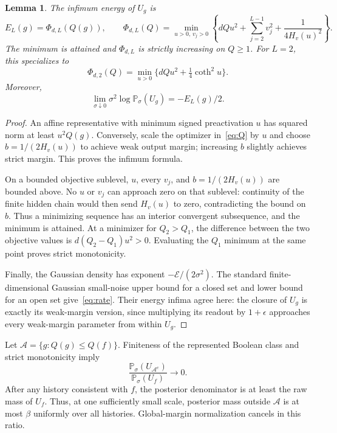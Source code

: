 \documentclass[11pt]{article}
\newtheorem{lemma}[theorem]{Lemma}
\newcommand{\Pp}{\mathbb P}
\begin{document}
\begin{lemma}\label{lem:energy}
The infimum energy of $U_g$ is
\begin{equation}\label{eq:phi}
 E_L(g)=\Phi_{d,L}(Q(g)),\qquad
 \Phi_{d,L}(Q)=\min_{u>0,\,v_j>0}
 \left\{dQu^2+\sum_{j=2}^{L-1}v_j^2+
              \frac{1}{4H_v(u)^2}\right\}.
\end{equation}
The minimum is attained and $\Phi_{d,L}$ is strictly increasing on $Q\ge1$. For $L=2$, this specializes to
\[
 \Phi_{d,2}(Q)=\min_{u>0}\{dQu^2+\tfrac14\coth^2u\}.
\]
Moreover,
\begin{equation}\label{eq:rate}
 \lim_{\sigma\downarrow0}\sigma^2\log\Pp_\sigma(U_g)
 =-E_L(g)/2.
\end{equation}
\end{lemma}
\begin{proof}
An affine representative with minimum signed preactivation $u$ has squared norm at least $u^2Q(g)$. Conversely, scale the optimizer in~\eqref{eq:Q} by $u$ and choose $b=1/(2H_v(u))$ to achieve weak output margin; increasing $b$ slightly achieves strict margin. This proves the infimum formula.

On a bounded objective sublevel, $u$, every $v_j$, and $b=1/(2H_v(u))$ are bounded above. No $u$ or $v_j$ can approach zero on that sublevel: continuity of the finite hidden chain would then send $H_v(u)$ to zero, contradicting the bound on $b$. Thus a minimizing sequence has an interior convergent subsequence, and the minimum is attained. At a minimizer for $Q_2>Q_1$, the difference between the two objective values is $d(Q_2-Q_1)u^2>0$. Evaluating the $Q_1$ minimum at the same point proves strict monotonicity.

Finally, the Gaussian density has exponent $-\mathcal E/(2\sigma^2)$. The standard finite-dimensional Gaussian small-noise upper bound for a closed set and lower bound for an open set give~\eqref{eq:rate}. Their energy infima agree here: the closure of $U_g$ is exactly its weak-margin version, since multiplying its readout by $1+\epsilon$ approaches every weak-margin parameter from within $U_g$.
\end{proof}

Let $\mathcal A=\{g:Q(g)\le Q(f)\}$. Finiteness of the represented Boolean class and strict monotonicity imply
\begin{equation}\label{eq:tail}
 \frac{\Pp_\sigma(U_{\mathcal A^c})}{\Pp_\sigma(U_f)}\longrightarrow0.
\end{equation}
After any history consistent with $f$, the posterior denominator is at least the raw mass of $U_f$. Thus, at one sufficiently small scale, posterior mass outside $\mathcal A$ is at most $\beta$ uniformly over all histories. Global-margin normalization cancels in this ratio.
\end{document}
